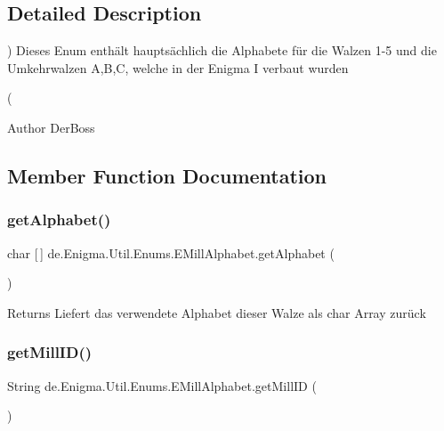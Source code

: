 \subsection{Detailed Description}
) Dieses Enum enthält hauptsächlich die Alphabete für die Walzen 1-\/5 und die Umkehrwalzen A,B,C, welche in der Enigma I verbaut wurden 

(\begin{DoxyAuthor}{Author}
Der\+Boss 
\end{DoxyAuthor}


\subsection{Member Function Documentation}
\mbox{\label{enumde_1_1_enigma_1_1_util_1_1_enums_1_1_e_mill_alphabet_a42738303dfbfa63d512306b1102a93cf}} 
\subsubsection{\texorpdfstring{get\+Alphabet()}{getAlphabet()}}
{\footnotesize\ttfamily char \mbox{[}$\,$\mbox{]} de.\+Enigma.\+Util.\+Enums.\+E\+Mill\+Alphabet.\+get\+Alphabet (\begin{DoxyParamCaption}{ }\end{DoxyParamCaption})}

\begin{DoxyReturn}{Returns}
Liefert das verwendete Alphabet dieser Walze als char Array zurück 
\end{DoxyReturn}
\mbox{\label{enumde_1_1_enigma_1_1_util_1_1_enums_1_1_e_mill_alphabet_a69675608ee623ace1204f2cd46483034}} 
\subsubsection{\texorpdfstring{get\+Mill\+I\+D()}{getMillID()}}
{\footnotesize\ttfamily String de.\+Enigma.\+Util.\+Enums.\+E\+Mill\+Alphabet.\+get\+Mill\+ID (\begin{DoxyParamCaption}{ }\end{DoxyParamCaption})}

